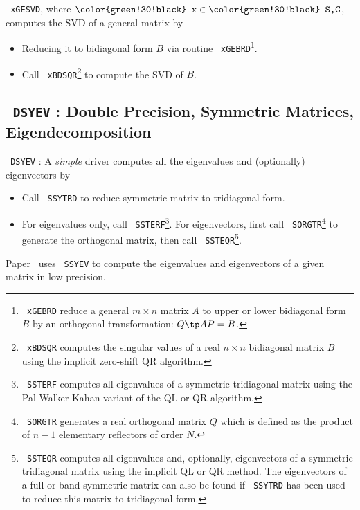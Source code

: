 \documentclass{article}
\renewcommand{\emph}[1]{\textit{\color{purple} #1}}
\newcommand{\code}[1]{\texttt{\color{green!30!black} #1}}
\begin{document}
\code{xGESVD}, where $\code{x} \in \code{S,C}$, computes the SVD of a
general matrix by 
\begin{itemize}[nosep]
    \item Reducing it to bidiagonal form $B$ via routine
    \code{xGEBRD}\footnote{\code{xGEBRD} reduce a general $m\times n$
    matrix $A$ to 
    upper or lower bidiagonal form $B$ by an orthogonal transformation:
    $Q\tp AP = B$.}.
    \item Call \code{xBDSQR}\footnote{\code{xBDSQR} computes the
    singular values of a 
    real $n\times n$ bidiagonal matrix $B$ using the implicit zero-shift
    QR algorithm.} to compute the SVD of $B$.
\end{itemize}
\subsection[\code{DSYEV}]{\code{DSYEV} : Double Precision, Symmetric
Matrices, Eigendecomposition}
\label{sec.DSYEV}
\code{DSYEV} : A \emph{simple} driver computes all the eigenvalues and
(optionally) eigenvectors by 
\begin{itemize}[nosep]
    \item Call \code{SSYTRD} to reduce symmetric matrix to tridiagonal
    form. 
    \item For eigenvalues only, call
    \code{SSTERF}\footnote{\code{SSTERF} computes all
    eigenvalues of a symmetric tridiagonal matrix using the
    Pal-Walker-Kahan variant of the QL or QR algorithm.}. 
    For eigenvectors, first call \code{SORGTR}\footnote{\code{SORGTR}
    generates a real orthogonal matrix $Q$ which is defined as the
    product of $n-1$ elementary reflectors of order $N$.} to generate
    the orthogonal matrix, then call
    \code{SSTEQR}\footnote{\code{SSTEQR} computes all eigenvalues and,
    optionally, eigenvectors of a symmetric tridiagonal matrix using the
    implicit QL or QR method.  The eigenvectors of a full or band
    symmetric matrix can also be found if \code{SSYTRD} has been used
    to reduce this matrix to  tridiagonal form.}.
\end{itemize}


\begin{remark}
    Paper~ uses \code{SSYEV} to compute the
    eigenvalues and eigenvectors of a given matrix in low precision.
\end{remark}




 
\end{document}
